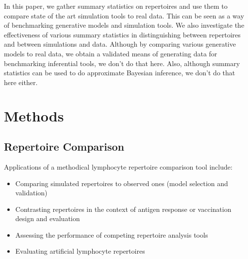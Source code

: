 \documentclass{article}
\begin{document}
In this paper, we gather summary statistics on repertoires and use them to compare state of the art simulation tools to real data.
This can be seen as a way of benchmarking generative models and simulation tools.
We also investigate the effectiveness of various summary statistics in distinguishing between repertoires and between simulations and data.
Although by comparing various generative models to real data, we obtain a validated means of generating data for benchmarking inferential tools, we don't do that here.
Also, although summary statistics can be used to do approximate Bayesian inference, we don't do that here either.

\section*{Methods}

\subsection*{Repertoire Comparison}

Applications of a methodical lymphocyte repertoire comparison tool include:
\begin{itemize}
\item Comparing simulated repertoires to observed ones (model selection and validation)
\item Contrasting repertoires in the context of antigen response or vaccination design and evaluation
\item Assessing the performance of competing repertoire analysis tools
\item Evaluating artificial lymphocyte repertoires \cite{Finlay2012}
\end{itemize}
\end{document}
